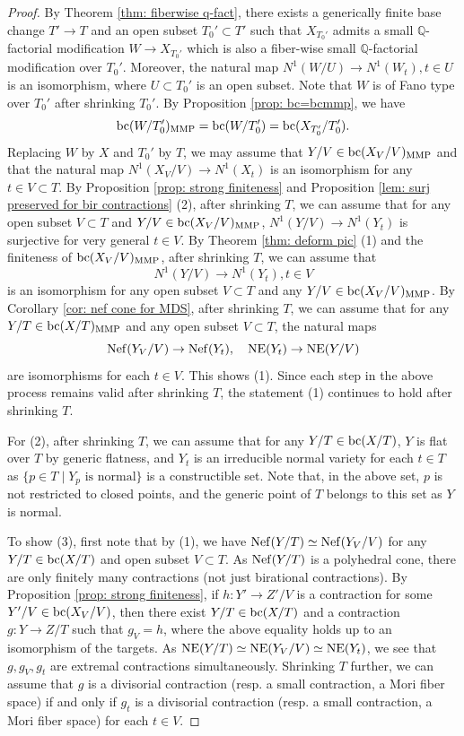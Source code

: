 \documentclass[11pt,oneside,reqno]{amsart}
\numberwithin{equation}{section}
\theoremstyle{definition}
\newcommand{\Nef}{{\rm {Nef}}}
\newcommand{\bc}{{\rm {bc}}}
\newcommand{\NE}{{\rm {NE}}}
\newcommand{\bQ}{\mathbb{Q}}
\begin{document}
 \begin{proof}
By Theorem \ref{thm: fiberwise q-fact}, there exists a generically finite base change $T' \to T$ and an open subset $T_0'\subset T'$ such that $X_{T_0'}$ admits a small $\bQ$-factorial modification $W \to X_{T_0'}$ which is also a fiber-wise small $\bQ$-factorial modification over $T_0'$. Moreover, the natural map $N^1(W/U) \to N^1(W_t), t\in U$ is an isomorphism, where $U\subset T_0'$ is an open subset. Note that $W$ is of Fano type over $T_0'$ after shrinking $T_0'$. By Proposition \ref{prop: bc=bcmmp}, we have
\[
\bc(W/T_0')_{\rm MMP}=\bc(W/T'_{0})= \bc(X_{T_0'}/T_0').
\] Replacing $W$ by $X$ and $T_0'$ by $T$, we may assume that $Y/V \in \bc(X_V/V)_{\rm{MMP}}$ and that the natural map $N^1(X_V/V) \to N^1(X_t)$ is an isomorphism for any $t \in V \subset T$.  By Proposition \ref{prop: strong finiteness} and Proposition \ref{lem: surj preserved for bir contractions} (2), after shrinking $T$, we can assume that for any open subset $V\subset T$ and $Y/V \in \bc(X_V/V)_{\rm MMP}$, $N^1(Y/V) \to N^1(Y_t)$ is surjective for very general $t\in V$. By Theorem \ref{thm: deform pic} (1) and the finiteness of $\bc(X_V/V)_{\rm MMP}$, after shrinking $T$, we can assume that
\[
N^1(Y/V) \to N^1(Y_t), t\in V
\] is an isomorphism for any open subset $V\subset T$ and any $Y/V \in \bc(X_V/V)_{\rm MMP}$. By Corollary \ref{cor: nef cone for MDS}, after shrinking $T$, we can assume that for any $Y/T \in \bc(X/T)_{\rm MMP}$ and any open subset $V\subset T$, the natural maps
 \[
\Nef(Y_V/V) \to \Nef(Y_t),  \quad \NE(Y_t) \to \NE(Y/V)
\] are isomorphisms for each $t\in V$. This shows (1). Since each step in the above process remains valid after shrinking $T$, the statement (1) continues to hold after shrinking $T$.

For (2), after shrinking $T$, we can assume that for any $Y/T\in \bc(X/T)$, $Y$ is flat over $T$ by generic flatness, and $Y_t$ is an irreducible normal variety for each $t\in T$ as $\{p\in T \mid Y_p \text{~is normal}\}$ is a constructible set. Note that, in the above set, $p$ is not restricted to closed points, and the generic point of $T$ belongs to this set as $Y$ is normal.

To show (3), first note that by (1), we have $\Nef(Y/T) \simeq \Nef(Y_V/V)$ for any $Y/T\in \bc(X/T)$ and open subset $V\subset T$. As $\Nef(Y/T)$ is a polyhedral cone, there are only finitely many contractions (not just birational contractions). By Proposition \ref{prop: strong finiteness}, if $h: Y' \to Z'/V$ is a contraction for some $Y'/V \in \bc(X_V/V)$, then there exist $Y/T \in \bc(X/T)$ and a contraction $g: Y \to Z/T$ such that $g_V= h$, where the above equality holds up to an isomorphism of the targets. As $\NE(Y/T) \simeq \NE(Y_V/V) \simeq \NE(Y_t)$, we see that $g, g_V, g_t$ are extremal contractions simultaneously. Shrinking $T$ further, we can assume that $g$ is a divisorial contraction (resp. a small contraction, a Mori fiber space) if and only if $g_t$ is a divisorial contraction (resp. a small contraction, a Mori fiber space) for each $t\in V$.
 \end{proof}
 
\end{document}

